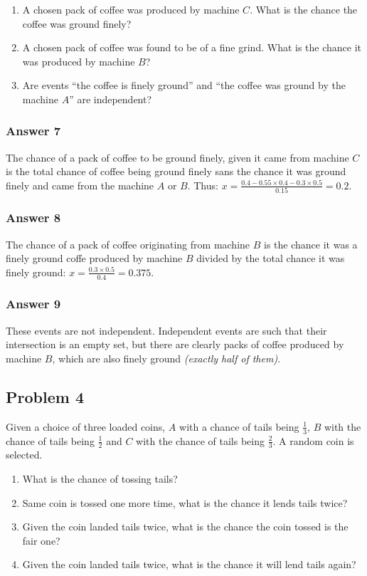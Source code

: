 \documentclass[11pt]{article}
\begin{document}
\begin{enumerate}
\item A chosen pack of coffee was produced by machine $C$.  What is the chance
the coffee was ground finely?
\item A chosen pack of coffee was found to be of a fine grind.  What is the
chance it was produced by machine $B$?
\item Are events ``the coffee is finely ground'' and ``the coffee was ground
by the machine $A$'' are independent?
\end{enumerate}

\subsubsection{Answer 7}
\label{sec-1-3-1}
The chance of a pack of coffee to be ground finely, given it came from machine
$C$ is the total chance of coffee being ground finely sans the chance it
was ground finely and came from the machine $A$ or $B$.  Thus:
$x = \frac{0.4 - 0.55 \times 0.4 - 0.3 \times 0.5}{0.15} = 0.2$.
\subsubsection{Answer 8}
\label{sec-1-3-2}
The chance of a pack of coffee originating from machine $B$ is the chance
it was a finely ground coffe produced by machine $B$ divided by the total
chance it was finely ground: $x = \frac{0.3 \times 0.5}{0.4} = 0.375$.
\subsubsection{Answer 9}
\label{sec-1-3-3}
These events are not independent.  Independent events are such that their
intersection is an empty set, but there are clearly packs of coffee produced
by machine $B$, which are also finely ground \emph{(exactly half of them)}.
\subsection{Problem 4}
\label{sec-1-4}
Given a choice of three loaded coins, $A$ with a chance of tails being $\frac{1}{3}$,
$B$ with the chance of tails being $\frac{1}{2}$ and $C$ with the chance of tails
being $\frac{2}{3}$.  A random coin is selected.

\begin{enumerate}
\item What is the chance of tossing tails?
\item Same coin is tossed one more time, what is the chance it lends tails twice?
\item Given the coin landed tails twice, what is the chance the coin tossed
is the fair one?
\item Given the coin landed tails twice, what is the chance it will lend tails
again?
\end{enumerate}
\end{document}
